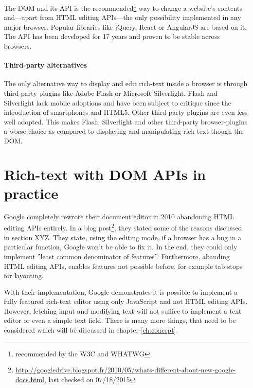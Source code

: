 
The DOM and its API is the recommended\footnote{recommended by the W3C and WHATWG} way to change a website's contents and---apart from HTML editing APIs---the only possibility implemented in any major browser. Popular libraries like jQuery, React or AngularJS are based on it. The API has been developed for 17 years and proven to be stable across browsers.

\paragraph{Third-party alternatives} The only alternative way to display and edit rich-text inside a browser is through third-party plugins like Adobe Flash or Microsoft Silverlight. Flash and Silverlight lack mobile adoptions and have been subject to critique since the introduction of smartphones and HTML5. Other third-party plugins are even less well adopted. This makes Flash, Silverlight and other third-party browser-plugins a worse choice as compared to displaying and manipulating rich-text though the DOM.

\section{Rich-text with DOM APIs in practice} Google completely rewrote their document editor in 2010 abandoning HTML editing APIs entirely. In a blog post\footnote{\url{http://googledrive.blogspot.fr/2010/05/whats-different-about-new-google-docs.html}, last checked on 07/18/2015}, they stated some of the reasons discussed in section XYZ. They state, using the editing mode, if a browser has a bug in a particular function, Google won't be able to fix it. In the end, they could only implement ''least common denominator of features''. Furthermore, abanding HTML editing APIs, enables features not possible before, for example tab stops for layouting. 

With their implementation, Google demonstrates it is possible to implement a fully featured rich-text editor using only JavaScript and not HTML editing APIs. However, fetching input and modifying text will not suffice to implement a text editor or even a simple text field. There is many more things, that need to be considered which will be discussed in chapter-\ref{ch:concept}. 


